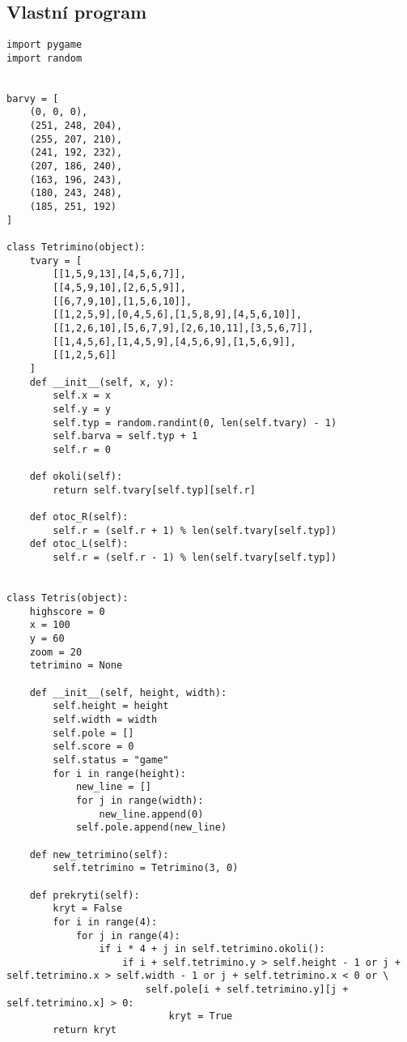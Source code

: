 \documentclass[12pt]{report}			%
\begin{document}
    \begin{appendices}
	\chapter{Vlastní program}	
\begin{lstlisting}[title={Program tetris.py}, caption={tetris.py}, 							label={lst:tetris.py}]
import pygame
import random


barvy = [
    (0, 0, 0),
    (251, 248, 204),
    (255, 207, 210),
    (241, 192, 232),
    (207, 186, 240),
    (163, 196, 243),
    (180, 243, 248),
    (185, 251, 192)
]

class Tetrimino(object):
    tvary = [
        [[1,5,9,13],[4,5,6,7]],
        [[4,5,9,10],[2,6,5,9]],
        [[6,7,9,10],[1,5,6,10]],
        [[1,2,5,9],[0,4,5,6],[1,5,8,9],[4,5,6,10]],
        [[1,2,6,10],[5,6,7,9],[2,6,10,11],[3,5,6,7]],
        [[1,4,5,6],[1,4,5,9],[4,5,6,9],[1,5,6,9]],
        [[1,2,5,6]]
    ]
    def __init__(self, x, y):
        self.x = x
        self.y = y
        self.typ = random.randint(0, len(self.tvary) - 1)
        self.barva = self.typ + 1
        self.r = 0    

    def okoli(self):
        return self.tvary[self.typ][self.r]

    def otoc_R(self):
        self.r = (self.r + 1) % len(self.tvary[self.typ])
    def otoc_L(self):
        self.r = (self.r - 1) % len(self.tvary[self.typ])


class Tetris(object):
    highscore = 0
    x = 100
    y = 60
    zoom = 20
    tetrimino = None

    def __init__(self, height, width):
        self.height = height
        self.width = width
        self.pole = []
        self.score = 0
        self.status = "game"
        for i in range(height):
            new_line = []
            for j in range(width):
                new_line.append(0)
            self.pole.append(new_line)

    def new_tetrimino(self):
        self.tetrimino = Tetrimino(3, 0)

    def prekryti(self):
        kryt = False
        for i in range(4):
            for j in range(4):
                if i * 4 + j in self.tetrimino.okoli():
                    if i + self.tetrimino.y > self.height - 1 or j + self.tetrimino.x > self.width - 1 or j + self.tetrimino.x < 0 or \
                        self.pole[i + self.tetrimino.y][j + self.tetrimino.x] > 0:
                            kryt = True
        return kryt


\end{lstlisting}
\end{appendices}
\end{document}
